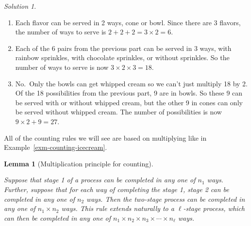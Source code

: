 \documentclass[
  letterpaper,
  DIV=11,
  numbers=noendperiod]{scrreprt}
\providecommand{\tightlist}{%
  \setlength{\itemsep}{0pt}\setlength{\parskip}{0pt}}
\theoremstyle{plain}
\newtheorem{lemma}{Lemma}[chapter]
\theoremstyle{definition}
\theoremstyle{definition}
\theoremstyle{definition}
\theoremstyle{remark}
\newtheorem{refsolution}{Solution}[chapter]
\begin{document}
\begin{tcolorbox}[enhanced jigsaw, opacityback=0, rightrule=.15mm, coltitle=black, colframe=quarto-callout-tip-color-frame, toprule=.15mm, colbacktitle=quarto-callout-tip-color!10!white, opacitybacktitle=0.6, left=2mm, toptitle=1mm, breakable, title={Solution (click to expand)}, bottomtitle=1mm, colback=white, leftrule=.75mm, titlerule=0mm, arc=.35mm, bottomrule=.15mm]

\begin{refsolution}
\leavevmode

\begin{enumerate}
\def\labelenumi{\arabic{enumi}.}
\tightlist
\item
  Each flavor can be served in 2 ways, cone or bowl. Since there are 3
  flavors, the number of ways to serve is \(2+2+2 = 3\times2 = 6\).
\item
  Each of the 6 pairs from the previous part can be served in 3 ways,
  with rainbow sprinkles, with chocolate sprinkles, or without
  sprinkles. So the number of ways to serve is now
  \(3\times 2 \times 3 = 18\).
\item
  No.~Only the bowls can get whipped cream so we can't just multiply 18
  by 2. Of the 18 possibilities from the previous part, 9 are in bowls.
  So these 9 can be served with or without whipped cream, but the other
  9 in cones can only be served without whipped cream. The number of
  possibilities is now \(9\times 2 + 9 = 27\).
\end{enumerate}

\label{sol-counting-icecream}

\end{refsolution}

\end{tcolorbox}

All of the counting rules we will see are based on multiplying like in
Example~\ref{exm-counting-icecream}.

\begin{lemma}[Multiplication principle for
counting]\protect\hypertarget{lem-multiplication-principle}{}\label{lem-multiplication-principle}

Suppose that stage 1 of a process can be completed in any one of \(n_1\)
ways. Further, suppose that for each way of completing the stage 1,
stage 2 can be completed in any one of \(n_2\) ways. Then the two-stage
process can be completed in any one of \(n_1\times n_2\) ways. This rule
extends naturally to a \(\ell\)-stage process, which can then be
completed in any one of
\(n_1\times n_2\times n_3\times\cdots\times n_\ell\) ways.

\end{lemma}
\end{document}
